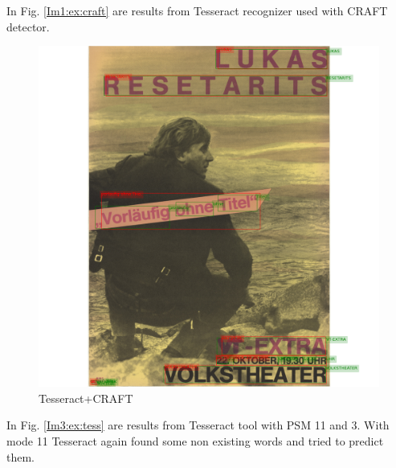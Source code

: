 In Fig. \ref{Im1:ex:craft} are results from Tesseract recognizer used with CRAFT detector.

\begin{figure}[hbtp!]
    \centering
    \includegraphics[scale=0.3]{obrazky/plakaty/result_carfttesseract_vienna2_split_special_snesitive-83.png}
    \caption{Tesseract+CRAFT}
    \label{Im3:ex:craft}
\end{figure}


In Fig. \ref{Im3:ex:tess} are results from Tesseract tool with PSM 11 and 3. With mode 11 Tesseract again found some non existing words and tried to predict them.

